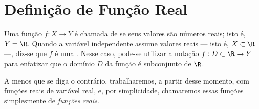 \section{Definição de Função Real}

\begin{definition}
    Uma função $f: X \to Y$ é chamada de  se seus valores são números reais; isto é, $Y = \R$.
    Quando a variável independente assume valores reais --- isto é, $X \subset \R$ ---, diz-se que $f$ é uma . Nesse caso, pode-se utilizar a notação $f:D\subset \R \to Y$ para enfatizar que o domínio $D$ da função é subconjunto de $\R$.
\end{definition}

A menos que se diga o contrário, trabalharemos, a partir desse momento, com funções reais de variável real, e, por simplicidade, chamaremos essas funções simplesmente de \emph{funções reais}. 
